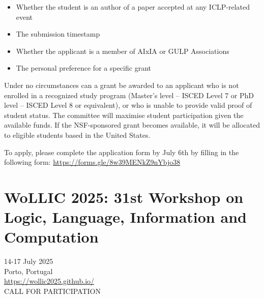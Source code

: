 \documentclass[prodmode,acmtecs]{acmsmall} %
\begin{document}
\begin{itemize}
\begin{itemize}\item  Whether the student is an author of a paper accepted at any ICLP-related event
\item  The submission timestamp
\item  Whether the applicant is a member of AIxIA or GULP Associations
\item  The personal preference for a specific grant
\end{itemize} 
  Under no circumstances can a grant be awarded to an applicant who is not enrolled in a recognized study program (Master’s level – ISCED Level 7 or PhD level – ISCED Level 8 or equivalent), or who is unable to provide valid proof of student status. The committee will maximise student participation given the available funds. If the NSF-sponsored grant becomes available, it will be allocated to eligible students based in the United States. 
 
  To apply, please complete the application form by July 6th by filling in the following form: \href{https://forms.gle/8w39MENkZ9nYbjo38}{https://forms.gle/8w39MENkZ9nYbjo38} 
 
\end{itemize}\section{WoLLIC 2025: 31st Workshop on Logic, Language, Information and Computation}\label{WoLLIC2025}  14-17 July 2025\\ 
  Porto, Portugal\\ 
  \href{https://wollic2025.github.io/}{https://wollic2025.github.io/}\\ 
CALL FOR PARTICIPATION 
\end{document}
